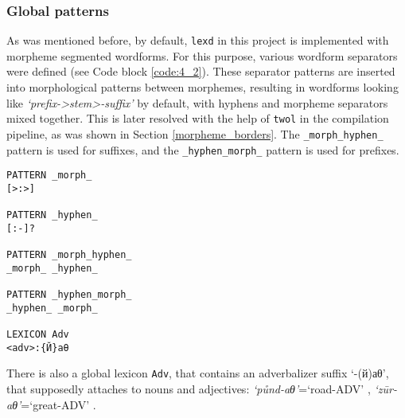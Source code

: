 \subsubsection*{Global patterns}
As was mentioned before, by default, \texttt{lexd} in this project is implemented with morpheme segmented wordforms. For this purpose, various wordform separators were defined (see Code block \ref{code:4_2}). These separator patterns are inserted into morphological patterns between morphemes, resulting in wordforms looking like \textit{`prefix->stem>-suffix'} by default, with hyphens and morpheme separators mixed together. This is later resolved with the help of \texttt{twol} in the compilation pipeline, as was shown in Section \ref{morpheme_borders}. The \texttt{\_morph\_hyphen\_} pattern is used for suffixes, and the \texttt{\_hyphen\_morph\_} pattern is used for prefixes.

\begin{code_frame}[float,floatplacement=!h]
    \begin{footnotesize}\codespacing
    \begin{verbatim}
PATTERN _morph_
[>:>]

PATTERN _hyphen_
[:-]?

PATTERN _morph_hyphen_
_morph_ _hyphen_

PATTERN _hyphen_morph_
_hyphen_ _morph_       

LEXICON Adv
<adv>:{Й}аθ
    \end{verbatim}
    \end{footnotesize}
    \tcblower
    \label{code:4_2}
\end{code_frame}

There is also a global lexicon \texttt{Adv}, that contains an adverbalizer suffix `-(й)аθ', that supposedly attaches to nouns and adjectives: \textit{`půnd-aθ'}=`road-ADV' \parencite[139]{parker_shughni_2023}, \textit{`zūr-aθ'}=`great-ADV' \parencite[433]{parker_shughni_2023}. 

\FloatBarrier

